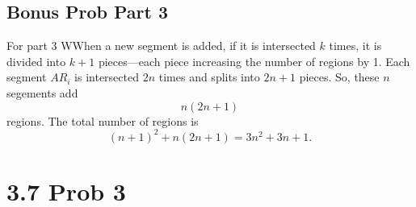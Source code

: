 \documentclass{report}
\begin{document}
\subsection*{Bonus Prob Part 3}

\begin{RemarkWithLily}{For part 3}
  WWhen a new segment is added, if it is intersected \(k\) times, it is divided 
  into \(k+1\) pieces—each piece increasing the number of regions by 1. 
  Each segment \(AR_i\) is intersected \(2n\) times and splits into \(2n+1\) pieces. So, these $n$ segements add
  \[
  n(2n+1)
  \]
  regions. The total number of regions is 
  \[
  (n+1)^2 + n(2n+1) = 3n^2+3n+1.
  \]

  
\end{RemarkWithLily}

\section*{3.7 Prob 3}

\end{document}
